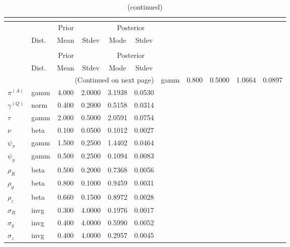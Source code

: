  
\begin{center}
\begin{longtable}{llcccc} 
\caption{Results from posterior maximization (parameters)}\\
 \label{Table:Posterior:1}\\
\toprule 
  & \multicolumn{3}{c}{Prior}  &  \multicolumn{2}{c}{Posterior} \\
  \cmidrule(r{.75em}){2-4} \cmidrule(r{.75em}){5-6}
  & Dist. & Mean  & Stdev & Mode & Stdev \\ 
\midrule \endfirsthead 
\caption{(continued)}\\
 \bottomrule 
  & \multicolumn{3}{c}{Prior}  &  \multicolumn{2}{c}{Posterior} \\
  \cmidrule(r{.75em}){2-4} \cmidrule(r{.75em}){5-6}
  & Dist. & Mean  & Stdev & Mode & Stdev \\ 
\midrule \endhead 
\bottomrule \multicolumn{6}{r}{(Continued on next page)}\endfoot 
\bottomrule\endlastfoot 
${r_{A}}$ & gamm &   0.800 & 0.5000 &   1.0664 &  0.0897 \\ 
${\pi^{(A)}}$ & gamm &   4.000 & 2.0000 &   3.1938 &  0.0530 \\ 
${\gamma^{(Q)}}$ & norm &   0.400 & 0.2000 &   0.5158 &  0.0314 \\ 
${\tau}$ & gamm &   2.000 & 0.5000 &   2.0591 &  0.0754 \\ 
${\nu}$ & beta &   0.100 & 0.0500 &   0.1012 &  0.0027 \\ 
${\psi_\pi}$ & gamm &   1.500 & 0.2500 &   1.4402 &  0.0464 \\ 
${\psi_y}$ & gamm &   0.500 & 0.2500 &   0.1094 &  0.0083 \\ 
${\rho_R}$ & beta &   0.500 & 0.2000 &   0.7368 &  0.0056 \\ 
${\rho_{g}}$ & beta &   0.800 & 0.1000 &   0.9459 &  0.0031 \\ 
${\rho_z}$ & beta &   0.660 & 0.1500 &   0.8972 &  0.0028 \\ 
${\sigma_R}$ & invg &   0.300 & 4.0000 &   0.1976 &  0.0017 \\ 
${\sigma_{g}}$ & invg &   0.400 & 4.0000 &   0.5990 &  0.0052 \\ 
${\sigma_z}$ & invg &   0.400 & 4.0000 &   0.2957 &  0.0045 \\ 
\end{longtable}
 \end{center}
